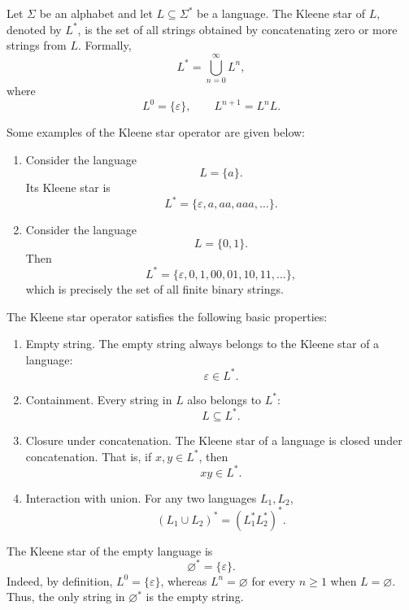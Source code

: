 \documentclass[10pt,a4paper]{article}
\begin{document}
\begin{definition}
Let $\Sigma$ be an alphabet and let $L\subseteq\Sigma^*$ be a language. The \textsf{Kleene star} of $L$, denoted by $L^*$, is the set of all strings obtained by concatenating zero or more strings from $L$. Formally,
\[
    L^*=\bigcup_{n=0}^{\infty}L^n,
\]
where
\[
    L^0=\{\varepsilon\},
    \qquad
    L^{n+1}=L^nL.
\]
\end{definition}

Some examples of the Kleene star operator are given below:
\begin{enumerate}
    \item  Consider the language
    \[
        L=\{a\}.
    \]
    Its Kleene star is
    \[
        L^*=\{\varepsilon,a,aa,aaa,\ldots\}.
    \]

    \item Consider the language
    \[
        L=\{0,1\}.
    \]
    Then
    \[
        L^*=\{\varepsilon,0,1,00,01,10,11,\ldots\},
    \]
    which is precisely the set of all finite binary strings.
\end{enumerate}

The Kleene star operator satisfies the following basic properties:
\begin{enumerate}
    \item \textcolor{violet!70!black}{\textsf{Empty string.}} The empty string always belongs to the Kleene star of a language:
    \[
        \varepsilon\in L^*.
    \]

    \item \textcolor{violet!70!black}{\textsf{Containment.}} Every string in $L$ also belongs to $L^*$:
    \[
        L\subseteq L^*.
    \]

    \item \textcolor{violet!70!black}{\textsf{Closure under concatenation.}} The Kleene star of a language is closed under concatenation. That is, if $x,y\in L^*$, then
    \[
        xy\in L^*.
    \]
    \item \textcolor{violet!70!black}{\textsf{Interaction with union.}}
For any two languages $L_1,L_2$,
\[
    (L_1\cup L_2)^*=(L_1^*L_2^*)^*.
\]
\end{enumerate}

\begin{remark}
The Kleene star of the empty language is
\[
    \varnothing^*=\{\varepsilon\}.
\]
Indeed, by definition, $L^0=\{\varepsilon\}$, whereas
$L^n=\varnothing$ for every $n\geq 1$ when $L=\varnothing$.
Thus, the only string in $\varnothing^*$ is the empty string.
\end{remark}
\end{document}
